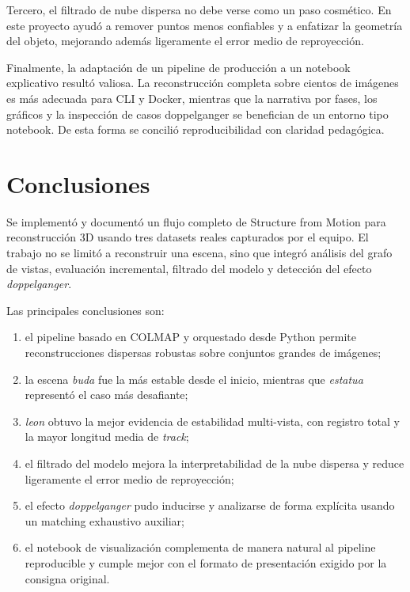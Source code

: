\documentclass[conference]{IEEEtran}
\begin{document}
Tercero, el filtrado de nube dispersa no debe verse como un paso cosm\'etico. En este proyecto ayud\'o a remover puntos menos confiables y a enfatizar la geometr\'ia del objeto, mejorando adem\'as ligeramente el error medio de reproyecci\'on.

Finalmente, la adaptaci\'on de un pipeline de producci\'on a un notebook explicativo result\'o valiosa. La reconstrucci\'on completa sobre cientos de im\'agenes es m\'as adecuada para CLI y Docker, mientras que la narrativa por fases, los gr\'aficos y la inspecci\'on de casos doppelganger se benefician de un entorno tipo notebook. De esta forma se concili\'o reproducibilidad con claridad pedag\'ogica.

\section{Conclusiones}\label{sec:conc}

Se implement\'o y document\'o un flujo completo de Structure from Motion para reconstrucci\'on 3D usando tres datasets reales capturados por el equipo. El trabajo no se limit\'o a reconstruir una escena, sino que integr\'o an\'alisis del grafo de vistas, evaluaci\'on incremental, filtrado del modelo y detecci\'on del efecto \emph{doppelganger}.

Las principales conclusiones son:
\begin{enumerate}
  \item el pipeline basado en COLMAP y orquestado desde Python permite reconstrucciones dispersas robustas sobre conjuntos grandes de im\'agenes;
  \item la escena \emph{buda} fue la m\'as estable desde el inicio, mientras que \emph{estatua} represent\'o el caso m\'as desafiante;
  \item \emph{leon} obtuvo la mejor evidencia de estabilidad multi-vista, con registro total y la mayor longitud media de \emph{track};
  \item el filtrado del modelo mejora la interpretabilidad de la nube dispersa y reduce ligeramente el error medio de reproyecci\'on;
  \item el efecto \emph{doppelganger} pudo inducirse y analizarse de forma expl\'icita usando un matching exhaustivo auxiliar;
  \item el notebook de visualizaci\'on complementa de manera natural al pipeline reproducible y cumple mejor con el formato de presentaci\'on exigido por la consigna original.
\end{enumerate}
\end{document}
